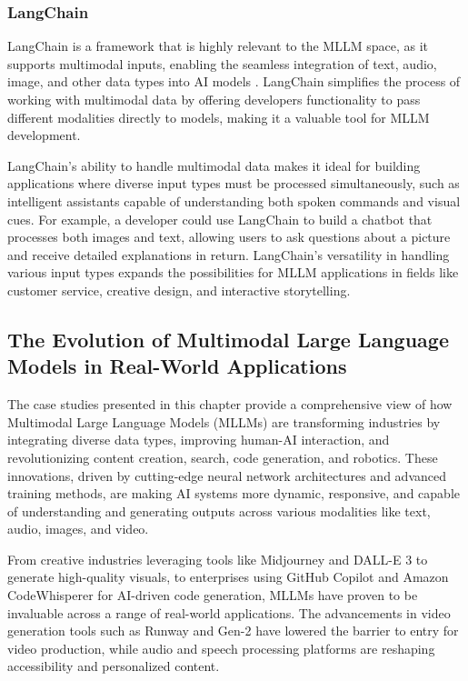 \subsubsection{LangChain}

LangChain is a framework that is highly relevant to the MLLM space, as it supports multimodal inputs, enabling the seamless integration of text, audio, image, and other data types into AI models \cite{chase2022langchain}. 
LangChain simplifies the process of working with multimodal data by offering developers functionality to pass different modalities directly to models, making it a valuable tool for MLLM development.

LangChain's ability to handle multimodal data makes it ideal for building applications where diverse input types must be processed simultaneously, such as intelligent assistants capable of understanding both spoken commands and visual cues. 
For example, a developer could use LangChain to build a chatbot that processes both images and text, allowing users to ask questions about a picture and receive detailed explanations in return. 
LangChain's versatility in handling various input types expands the possibilities for MLLM applications in fields like customer service, creative design, and interactive storytelling.


\subsection{The Evolution of Multimodal Large Language Models in Real-World Applications}
The case studies presented in this chapter provide a comprehensive view of how Multimodal Large Language Models (MLLMs) are transforming industries by integrating diverse data types, improving human-AI interaction, and revolutionizing content creation, search, code generation, and robotics. These innovations, driven by cutting-edge neural network architectures and advanced training methods, are making AI systems more dynamic, responsive, and capable of understanding and generating outputs across various modalities like text, audio, images, and video.

From creative industries leveraging tools like Midjourney \cite{Midjourney} and DALL-E 3 \cite{DALLE3} to generate high-quality visuals, to enterprises using GitHub Copilot \cite{GitHubCopilot} and Amazon CodeWhisperer \cite{AmazonCodeWhisperer} for AI-driven code generation, MLLMs have proven to be invaluable across a range of real-world applications. The advancements in video generation tools such as Runway \cite{ha2022runway} and Gen-2 \cite{esser2023gen2} have lowered the barrier to entry for video production, while audio and speech processing platforms are reshaping accessibility and personalized content.

